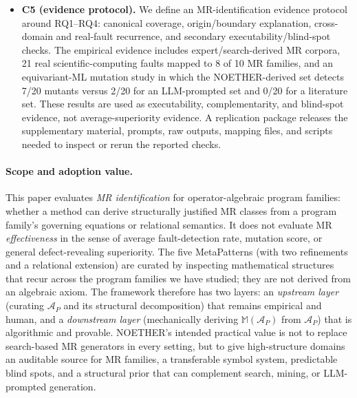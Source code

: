 \documentclass[acmsmall,screen,review]{acmart}
\begin{document}
\begin{itemize}
  \item \textbf{C5 (evidence protocol).} We define an MR-identification evidence protocol around RQ1--RQ4: canonical coverage, origin/boundary explanation, cross-domain and real-fault recurrence, and secondary executability/blind-spot checks. The empirical evidence includes expert/search-derived MR corpora, 21 real scientific-computing faults mapped to 8 of 10 MR families, and an equivariant-ML mutation study in which the NOETHER-derived set detects 7/20 mutants versus 2/20 for an LLM-prompted set and 0/20 for a literature set. These results are used as executability, complementarity, and blind-spot evidence, not average-superiority evidence. A replication package releases the supplementary material, prompts, raw outputs, mapping files, and scripts needed to inspect or rerun the reported checks.
\end{itemize}

\paragraph{Scope and adoption value.} This paper evaluates \emph{MR identification} for operator-algebraic program families: whether a method can derive structurally justified MR classes from a program family's governing equations or relational semantics. It does not evaluate MR \emph{effectiveness} in the sense of average fault-detection rate, mutation score, or general defect-revealing superiority. The five MetaPatterns (with two refinements and a relational extension) are curated by inspecting mathematical structures that recur across the program families we have studied; they are not derived from an algebraic axiom. The framework therefore has two layers: an \emph{upstream layer} (curating $\mathcal{A}_P$ and its structural decomposition) that remains empirical and human, and a \emph{downstream layer} (mechanically deriving $\mathbb{M}(\mathcal{A}_P)$ from $\mathcal{A}_P$) that is algorithmic and provable. NOETHER's intended practical value is not to replace search-based MR generators in every setting, but to give high-structure domains an auditable source for MR families, a transferable symbol system, predictable blind spots, and a structural prior that can complement search, mining, or LLM-prompted generation.
\end{document}
